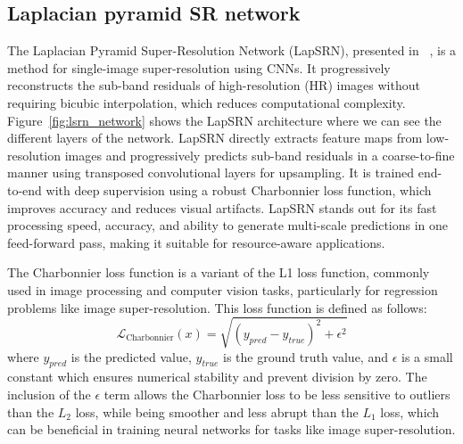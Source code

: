 




\tocless\subsection{Laplacian pyramid SR network}

The Laplacian Pyramid Super-Resolution Network (LapSRN), presented in
~\citep{lai2017deep}, is a 
method for single-image super-resolution using CNNs. 
It progressively reconstructs the sub-band residuals of high-resolution (HR) images
without requiring bicubic interpolation, which reduces computational complexity.
Figure~\ref{fig:lsrn_network} 
shows the LapSRN architecture where we can see the different layers of the network.
LapSRN directly extracts feature maps from low-resolution images and
progressively predicts sub-band residuals in a coarse-to-fine manner using
transposed convolutional layers for upsampling. It is trained end-to-end with
deep supervision using a robust Charbonnier loss function, which improves
accuracy and reduces visual artifacts. LapSRN stands out for its fast processing
speed, accuracy, and ability to generate multi-scale predictions in one
feed-forward pass, making it suitable for resource-aware applications.

\begin{remark}
    The Charbonnier loss function is a variant of the L1 loss function,
    commonly used in image processing and computer vision tasks, particularly
    for regression problems like image super-resolution.
    This loss function is defined as follows:
    \begin{equation*}
        \mathcal{L}_{\text{Charbonnier}}(x) = \sqrt{(y_{pred}-y_{true})^2 + \epsilon^2}
    \end{equation*}
    where $y_{pred}$ is the predicted value, $y_{true}$ is the ground truth value,
    and  $\epsilon$ is a small constant which ensures numerical stability and
    prevent division by zero.
    The inclusion of the $\epsilon$ term allows the Charbonnier loss to be less 
    sensitive to outliers than the $L_2$ loss, while being smoother and less abrupt 
    than the $L_1$ loss, which can be beneficial in training neural networks for 
    tasks like image super-resolution.
\end{remark}

